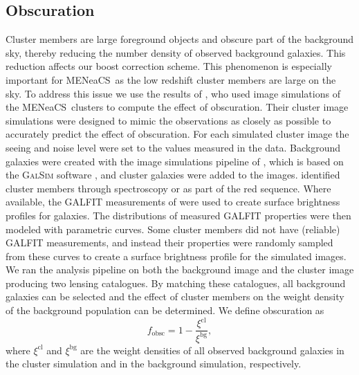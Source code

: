 \documentclass[useAMS,usenatbib]{mnras}
\newcommand{\mn}{MENeaCS}
\begin{document}
\subsection{Obscuration}
\label{sec:obscuration}
Cluster members are large foreground objects and obscure part of the background sky, thereby reducing the number density of observed background galaxies. This reduction affects our boost correction scheme. This phenomenon is especially important for \mn \ as the low redshift cluster members are large on the sky. To address this issue we use the results of \citet{sifon18}, who used image simulations of the \mn \ clusters to compute the effect of obscuration. Their cluster image simulations were designed to mimic the observations as closely as possible to accurately predict the effect of obscuration. For each simulated cluster image the seeing and noise level were set to the values measured in the data. Background galaxies were created with the image simulations pipeline of , which is based on the \textsc{GalSim} software \citep{galsim}, and cluster galaxies were added to the images. \cite{sifon15} identified cluster members through spectroscopy or as part of the red sequence. Where available, the \textsc{GALFIT} \citep{galfit} measurements of \cite{sifon15} were used to create surface brightness profiles for galaxies. The distributions of measured \textsc{GALFIT} properties were then modeled with parametric curves. Some cluster members did not have (reliable) \textsc{GALFIT} measurements, and instead their properties were randomly sampled from these curves to create a surface brightness profile for the simulated images.
We ran the analysis pipeline on both the background image and the cluster image producing two lensing catalogues. By matching these catalogues, all background galaxies can be selected and the effect of cluster members on the weight density of the background population can be determined. We define obscuration as
\begin{equation}
 f_\mathrm{obsc} = 1 - \frac{\xi^\mathrm{cl}}{\xi^\mathrm{bg}} ,
 \label{eq:obscuration}
\end{equation} 
where $\xi^\mathrm{cl}$ and $\xi^\mathrm{bg}$ are the weight densities of all observed background galaxies in the cluster simulation and in the background simulation, respectively.
\end{document}
